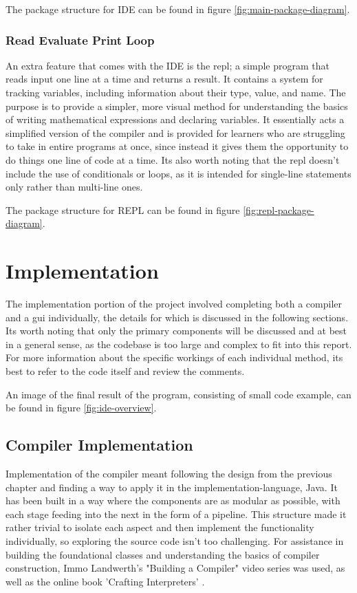 \documentclass[
]{report}
\begin{document}
The package structure for IDE can be found in figure \ref{fig:main-package-diagram}.

\subsection{Read Evaluate Print Loop}
An extra feature that comes with the IDE is the \acrshort{repl}; a simple program
that reads input one line at a time and returns a result. It contains a
system for tracking variables, including information about their type,
value, and name. The purpose is to provide a simpler, more visual method
for understanding the basics of writing mathematical \glspl{expression} and
declaring variables. It essentially acts a simplified version of the
compiler and is provided for learners who are struggling to take in
entire programs at once, since instead it gives them the opportunity to
do things one line of code at a time. Its also worth noting that the
\acrshort{repl} doesn't include the use of conditionals or loops, as it is intended
for single-line \glspl{statement} only rather than multi-line ones.

The package structure for REPL can be found in figure \ref{fig:repl-package-diagram}.

\chapter{Implementation}
The implementation portion of the project involved completing both a
compiler and a \acrshort{gui} individually, the details for which is discussed in
the following sections. Its worth noting that only the primary
components will be discussed and at best in a general sense, as the
codebase is too large and complex to fit into this report. For more
information about the specific workings of each individual method, its
best to refer to the code itself and review the comments.

An image of the final result of the program, consisting of small code example, can
be found in figure \ref{fig:ide-overview}.

\section{Compiler Implementation}
Implementation of the compiler meant following the design from the
previous chapter and finding a way to apply it in the \gls{implementation-language}, Java.
It has been built in a way where the components are as modular as possible, with
each stage feeding into the next in the form of a pipeline. This
structure made it rather trivial to isolate each aspect and then
implement the functionality individually, so exploring the source code
isn't too challenging. For assistance in building the foundational classes
and understanding the basics of compiler construction, Immo Landwerth's "Building
a Compiler" video series \cite{compiler-video} was used, as well as the online
book 'Crafting Interpreters' \cite{crafting-interpreters}.
\end{document}
